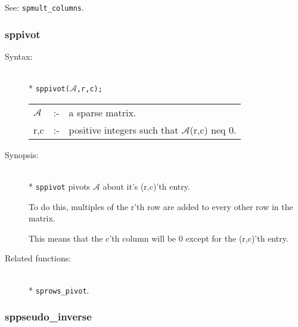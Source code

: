 See: \texttt{spmult\_columns}.


\subsubsection{sppivot}
\label{sparse:sppivot}

\begin{description}
\item[Syntax:]\mbox{}\\*
\texttt{sppivot($\mathcal{A}$,r,c);}\\[2mm]
\begin{tabular}{l l l}
$\mathcal{A}$ &:-& a sparse matrix. \\
r,c        &:-& positive integers such that $\mathcal{A}$(r,c) neq 0.
\end{tabular}

\item[Synopsis:]\mbox{}\\*
\texttt{sppivot} pivots $\mathcal{A}$ about it's (r,c)'th entry.

To do this, multiples of the r'th row are added to every
     other row in the matrix.

This means that the c'th column
                will be 0 except for the (r,c)'th entry.

\item[Related functions:]\mbox{}\\*
\texttt{sprows\_pivot}.
\end{description}


\subsubsection{sppseudo\_inverse}
\label{sparse:sppseudo_inverse}

